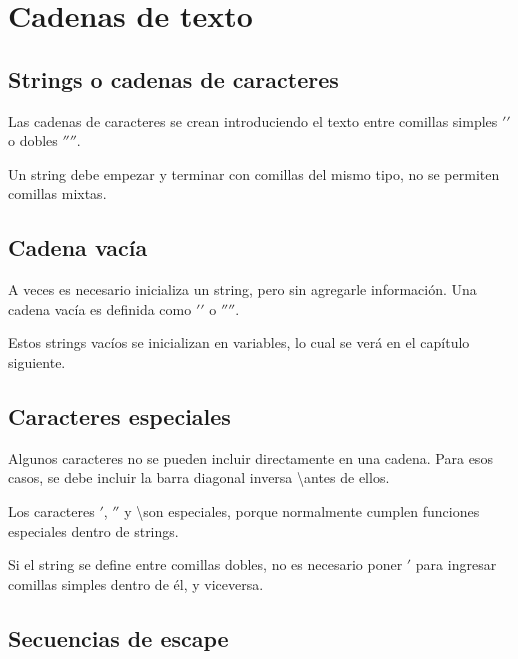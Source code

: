 \documentclass{report}
\begin{document}
\clearpage\chapter{Cadenas de texto}

\section{Strings o cadenas de caracteres}

Las cadenas de caracteres se crean introduciendo el texto entre comillas simples $'$$'$ o dobles $''$$''$.


Un string debe empezar y terminar con comillas del mismo tipo, no se permiten comillas mixtas.


\section{Cadena vacía}

A veces es necesario inicializa un string, pero sin agregarle información. Una cadena vacía es definida como $'$$'$ o $''$$''$.


Estos strings vacíos se inicializan en variables, lo cual se verá en el capítulo siguiente.

\section{Caracteres especiales}

Algunos caracteres no se pueden incluir directamente en una cadena. Para esos casos, se debe incluir la barra diagonal inversa \textbackslash antes de ellos.


Los caracteres $'$, $''$ y \textbackslash son especiales, porque normalmente cumplen funciones especiales dentro de strings.

Si el string se define entre comillas dobles, no es necesario poner $'$ para ingresar comillas simples dentro de él, y viceversa.


\section{Secuencias de escape}
\end{document}
